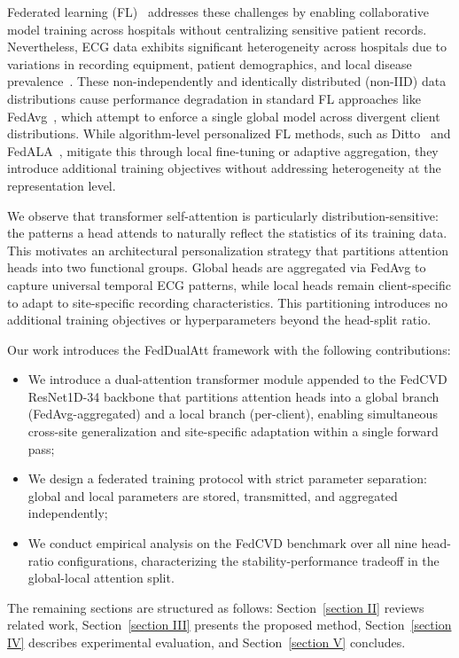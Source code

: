\documentclass[conference]{IEEEtran}
\begin{document}
{Federated learning (FL)~\cite{DBLP:journals/corr/McMahanMRA16} addresses these challenges by enabling collaborative model training across hospitals without centralizing sensitive patient records. Nevertheless, ECG data exhibits significant heterogeneity across hospitals due to variations in recording equipment, patient demographics, and local disease prevalence~\cite{fedcvd}. These non-independently and identically distributed (non-IID) data distributions cause performance degradation in standard FL approaches like FedAvg~\cite{DBLP:journals/corr/McMahanMRA16}, which attempt to enforce a single global model across divergent client distributions. While algorithm-level personalized FL methods, such as Ditto~\cite{ditto} and FedALA~\cite{fedala}, mitigate this through local fine-tuning or adaptive aggregation, they introduce additional training objectives without addressing heterogeneity at the representation level. 

We observe that transformer self-attention is particularly distribution-sensitive: the patterns a head attends to naturally reflect the statistics of its training data. This motivates an architectural personalization strategy that partitions attention heads into two functional groups. Global heads are aggregated via FedAvg to capture universal temporal ECG patterns, while local heads remain client-specific to adapt to site-specific recording characteristics. This partitioning introduces no additional training objectives or hyperparameters beyond the head-split ratio.

Our work introduces the FedDualAtt framework with the following contributions:
\begin{itemize} 
    \item We introduce a dual-attention transformer module appended to the FedCVD~\cite{fedcvd} ResNet1D-34 backbone that partitions attention heads into a global branch (FedAvg-aggregated) and a local branch (per-client), enabling simultaneous cross-site generalization and site-specific adaptation within a single forward pass; 
    \item We design a federated training protocol with strict parameter separation: global and local parameters are stored, transmitted, and aggregated independently; 
    \item We conduct empirical analysis on the FedCVD benchmark over all nine head-ratio configurations, characterizing the stability-performance tradeoff in the global-local attention split. 
\end{itemize} 
The remaining sections are structured as follows: Section~\ref{section II} reviews related work, Section~\ref{section III} presents the proposed method, Section~\ref{section IV} describes experimental evaluation, and Section~\ref{section V} concludes.

}
\end{document}
